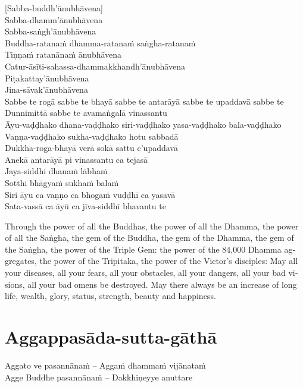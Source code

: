 [Sabba-buddh'ānubhāvena]\\
Sabba-dhamm'ānubhāvena\\
Sabba-saṅgh'ānubhāvena\\
Buddha-ratanaṁ dhamma-ratanaṁ saṅgha-ratanaṁ\\
Tiṇṇaṁ ratanānaṁ ānubhāvena\\
Catur-āsīti-sahassa-dhammakkhandh'ānubhāvena\\
Piṭakattay'ānubhāvena\\
Jina-sāvak'ānubhāvena\\
Sabbe te rogā sabbe te bhayā sabbe te antarāyā sabbe te upaddavā sabbe te\\
Dunnimittā sabbe te avamaṅgalā vinassantu\\
Āyu-vaḍḍhako dhana-vaḍḍhako siri-vaḍḍhako yasa-vaḍḍhako bala-vaḍḍhako\\
Vaṇṇa-vaḍḍhako sukha-vaḍḍhako hotu sabbadā\\
Dukkha-roga-bhayā verā sokā sattu c'upaddavā\\
Anekā antarāyā pi vinassantu ca tejasā\\
Jaya-siddhi dhanaṁ lābhaṁ\\
Sotthi bhāgyaṁ sukhaṁ balaṁ\\
Siri āyu ca vaṇṇo ca bhogaṁ vuḍḍhī ca yasavā\\
Sata-vassā ca āyū ca jīva-siddhī bhavantu te

\begin{english}
  Through the power of all the Buddhas, the power of all the Dhamma, the power of all the Saṅgha, the gem of the Buddha, the gem of the Dhamma, the gem of the Saṅgha, the power of the Triple Gem: the power of the 84,000 Dhamma aggregates, the power of the Tripitaka, the power of the Victor’s disciples: May all your diseases, all your fears, all your obstacles, all your dangers, all your bad visions, all your bad omens be destroyed. May there always be an increase of long life, wealth, glory, status, strength, beauty and happiness.
\end{english}


\section{Aggappasāda-sutta-gāthā}

\begin{twochants}
  Aggato ve pasannānaṁ – Aggaṁ dhammaṁ vijānataṁ\\
  Agge Buddhe pasannānaṁ – Dakkhiṇeyye anuttare\\
\end{twochants}

